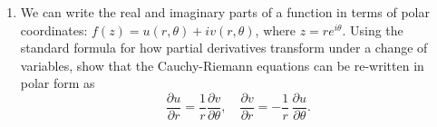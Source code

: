 \documentclass[10pt,a4paper]{article}
\begin{document}
\begin{enumerate}
\item
We can write the real and imaginary parts of a function in terms of
polar coordinates: $f(z) = u(r,\theta) + i v(r,\theta)$, where $z =
re^{i\theta}$. Using the standard formula for how partial derivatives
transform under a change of variables, show that the Cauchy-Riemann
equations can be re-written in polar form as
\begin{equation}
\frac{\partial u}{\partial r} =  \frac{1}{r} \frac{\partial v}{\partial \theta}, \quad \frac{\partial v}{\partial r} =  - \frac{1}{r}\,  \frac{\partial u}{\partial \theta}.
\end{equation}
\end{enumerate}
    
\end{document}
